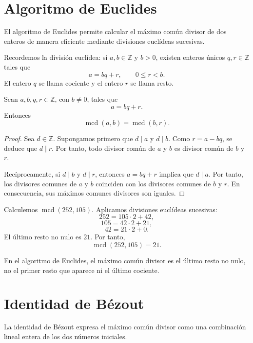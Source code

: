 \section{Algoritmo de Euclides}

El algoritmo de Euclides permite calcular el máximo común divisor de dos enteros de manera eficiente mediante divisiones euclídeas sucesivas.

Recordemos la división euclídea: si \(a,b\in\mathbb{Z}\) y \(b>0\), existen enteros únicos \(q,r\in\mathbb{Z}\) tales que
\[
a=bq+r,
\qquad
0\leq r<b.
\]
El entero \(q\) se llama cociente y el entero \(r\) se llama resto.

\begin{lema}
Sean \(a,b,q,r\in\mathbb{Z}\), con \(b\neq 0\), tales que
\[
a=bq+r.
\]
Entonces
\[
\operatorname{mcd}(a,b)=\operatorname{mcd}(b,r).
\]
\end{lema}

\begin{proof}
Sea \(d\in\mathbb{Z}\). Supongamos primero que \(d\mid a\) y \(d\mid b\). Como \(r=a-bq\), se deduce que \(d\mid r\). Por tanto, todo divisor común de \(a\) y \(b\) es divisor común de \(b\) y \(r\).

Recíprocamente, si \(d\mid b\) y \(d\mid r\), entonces \(a=bq+r\) implica que \(d\mid a\). Por tanto, los divisores comunes de \(a\) y \(b\) coinciden con los divisores comunes de \(b\) y \(r\). En consecuencia, sus máximos comunes divisores son iguales.
\end{proof}

\begin{ejemplo}
Calculemos \(\operatorname{mcd}(252,105)\). Aplicamos divisiones euclídeas sucesivas:
\[
252=105\cdot 2+42,
\]
\[
105=42\cdot 2+21,
\]
\[
42=21\cdot 2+0.
\]
El último resto no nulo es \(21\). Por tanto,
\[
\operatorname{mcd}(252,105)=21.
\]
\end{ejemplo}

\begin{advertencia}
En el algoritmo de Euclides, el máximo común divisor es el último resto no nulo, no el primer resto que aparece ni el último cociente.
\end{advertencia}

\section{Identidad de Bézout}

La identidad de Bézout expresa el máximo común divisor como una combinación lineal entera de los dos números iniciales.

